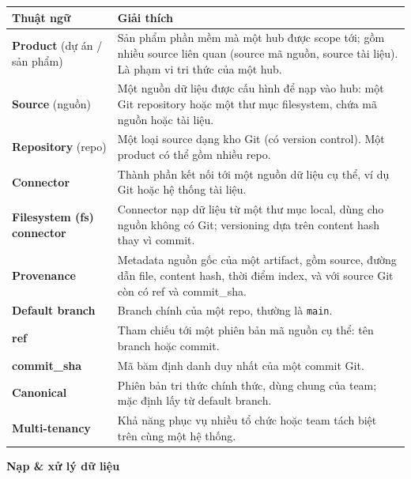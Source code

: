 \begin{table}[H]
\centering
\begin{tabular}{p{3cm}p{12cm}}
\toprule
Thuật ngữ & Giải thích \\
\midrule
\textbf{Product} (dự án / sản phẩm) & Sản phẩm phần mềm mà một hub được scope tới; gồm nhiều source liên quan (source mã nguồn, source tài liệu). Là phạm vi tri thức của một hub. \\
\textbf{Source} (nguồn) & Một nguồn dữ liệu được cấu hình để nạp vào hub: một Git repository hoặc một thư mục filesystem, chứa mã nguồn hoặc tài liệu. \\
\textbf{Repository} (repo) & Một loại source dạng kho Git (có version control). Một product có thể gồm nhiều repo. \\
\textbf{Connector} & Thành phần kết nối tới một nguồn dữ liệu cụ thể, ví dụ Git hoặc hệ thống tài liệu. \\
\textbf{Filesystem (fs) connector} & Connector nạp dữ liệu từ một thư mục local, dùng cho nguồn không có Git; versioning dựa trên content hash thay vì commit. \\
\textbf{Provenance} & Metadata nguồn gốc của một artifact, gồm source, đường dẫn file, content hash, thời điểm index, và với source Git còn có ref và commit\_sha. \\
\textbf{Default branch} & Branch chính của một repo, thường là \texttt{main}. \\
\textbf{ref} & Tham chiếu tới một phiên bản mã nguồn cụ thể: tên branch hoặc commit. \\
\textbf{commit\_sha} & Mã băm định danh duy nhất của một commit Git. \\
\textbf{Canonical} & Phiên bản tri thức chính thức, dùng chung của team; mặc định lấy từ default branch. \\
\textbf{Multi-tenancy} & Khả năng phục vụ nhiều tổ chức hoặc team tách biệt trên cùng một hệ thống. \\
\bottomrule
\end{tabular}
\end{table}

\textbf{Nạp \& xử lý dữ liệu}

